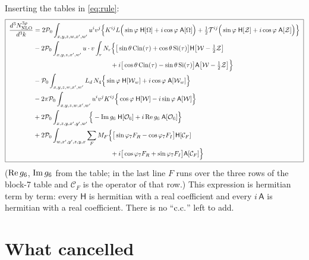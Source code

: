 \documentclass[10pt]{article}
\numberwithin{equation}{section}
\begin{document}
Inserting the tables in \eqref{eq:rule}:
\begin{align}
\boxed{\;\begin{aligned}
\frac{d^{3}N^{3\rho}_{\rm NLO}}{d^{3}k}&=2\mathcal{P}_{0}\int_{x,y,z,w,x',w'}u^{i}v^{j}\Big\{K^{ij}L\Big(\sin\varphi\;\mathsf{H}[\Omega]+i\cos\varphi\;\mathsf{A}[\Omega]\Big)+\tfrac12\mathcal{T}^{ij}\Big(\sin\varphi\;\mathsf{H}[\mathcal{Z}]+i\cos\varphi\;\mathsf{A}[\mathcal{Z}]\Big)\Big\}\\
&-2\mathcal{P}_{0}\int_{x,y,z,x',w'}u\cdot v\int_{r}N_{r}\Big\{\big[\sin\theta\,{\rm Cin}(\tau)+\cos\theta\,{\rm Si}(\tau)\big]\mathsf{H}\big[\mathcal{W}-\tfrac12\mathcal{Z}\big]\\
&\hspace{4.2cm}+i\big[\cos\theta\,{\rm Cin}(\tau)-\sin\theta\,{\rm Si}(\tau)\big]\mathsf{A}\big[\mathcal{W}-\tfrac12\mathcal{Z}\big]\Big\}\\
&-\mathcal{P}_{0}\int_{x,y,z,w,x',w'}L_{d}\,N_{4}\Big\{\sin\varphi\;\mathsf{H}[\mathcal{W}_{w}]+i\cos\varphi\;\mathsf{A}[\mathcal{W}_{w}]\Big\}\\
&-2\pi\mathcal{P}_{0}\int_{x,y,z,w,x',w'}u^{i}v^{j}K^{ij}\Big\{\cos\varphi\;\mathsf{H}[\mathcal{W}]-i\sin\varphi\;\mathsf{A}[\mathcal{W}]\Big\}\\
&+2\mathcal{P}_{0}\int_{x,z,y,x',y',w'}\Big\{-{\rm Im}\,g_{6}\;\mathsf{H}[\mathcal{O}_{6}]+i\,{\rm Re}\,g_{6}\;\mathsf{A}[\mathcal{O}_{6}]\Big\}\\
&+2\mathcal{P}_{0}\int_{w,x',y',z,y,x}\sum_{F}M_{F}\Big\{\big[\sin\varphi_{7}F_{R}-\cos\varphi_{7}F_{I}\big]\mathsf{H}[\mathcal{C}_{F}]\\
&\hspace{4.2cm}+i\big[\cos\varphi_{7}F_{R}+\sin\varphi_{7}F_{I}\big]\mathsf{A}[\mathcal{C}_{F}]\Big\}
\end{aligned}\;} \label{eq:result}
\end{align}
(${\rm Re}\,g_{6}$, ${\rm Im}\,g_{6}$ from the table; in the last line $F$ runs over the three rows of the block-7 table and $\mathcal{C}_{F}$ is the operator of that row.) This expression is hermitian term by term: every $\mathsf{H}$ is hermitian with a real coefficient and every $i\,\mathsf{A}$ is hermitian with a real coefficient. There is no ``${\rm c.c.}$'' left to add.

\section{What cancelled}
\end{document}
